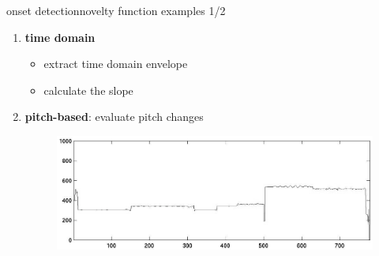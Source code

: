         \begin{frame}{onset detection}{novelty function examples 1/2}
            \begin{enumerate}
                \item	\textbf{time domain}
                    \begin{itemize}
                        \item	extract time domain envelope
                        \item<2->	calculate the slope
                    \end{itemize}
                \bigskip
                \item<3->	\textbf{pitch-based}: evaluate pitch changes
                        \begin{figure}[t]
                            \centering
                            \includegraphics[scale=.25]{graph/pitch_onset}
                        \end{figure}
            \end{enumerate}
        \end{frame}
